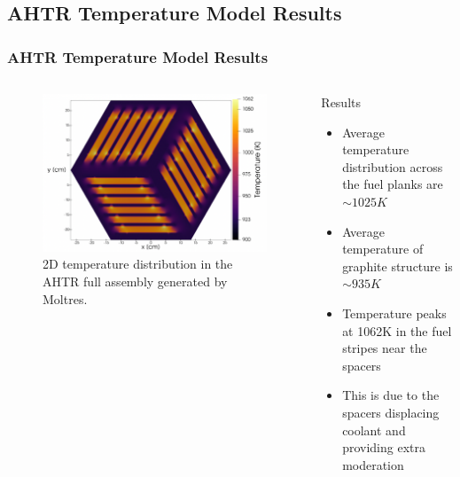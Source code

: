 \subsection{AHTR Temperature Model Results}
\begin{frame}
    \frametitle{AHTR Temperature Model Results}
    \begin{columns}
        \begin{column}{0.6\textwidth}
            \begin{figure}[]
                \centering
                \includegraphics[width=\linewidth]{../docs/figures/benchmark-temperature-model.png} 
                \caption{2D temperature distribution in the \acrfull{AHTR}
                full assembly generated by Moltres.}
            \end{figure}
        \end{column}
        \begin{column}{0.4\textwidth} 
            \begin{block}{Results}
                \begin{itemize}
                    \item Average temperature distribution across the fuel planks are 
                    $\sim 1025K$
                    \item Average temperature of graphite structure is $\sim 935K$
                    \item Temperature peaks at 1062K in the fuel stripes near the spacers
                    \item This is due to the spacers displacing coolant and providing extra 
                    moderation 
                \end{itemize}
            \end{block}
        \end{column}
        \end{columns}
\end{frame}


